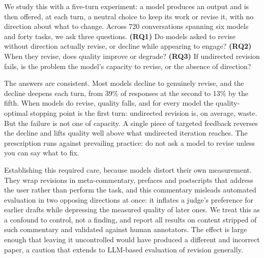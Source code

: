 We study this with a five-turn experiment: a model produces an output and is then offered, at each turn, a neutral choice to keep its work or revise it, with no direction about what to change. Across 720 conversations spanning six models and forty tasks, we ask three questions. \textbf{(RQ1)} Do models asked to revise without direction actually revise, or decline while appearing to engage? \textbf{(RQ2)} When they revise, does quality improve or degrade? \textbf{(RQ3)} If undirected revision fails, is the problem the model's capacity to revise, or the absence of direction?

The answers are consistent. Most models decline to genuinely revise, and the decline deepens each turn, from 39\% of responses at the second to 13\% by the fifth. When models do revise, quality falls, and for every model the quality-optimal stopping point is the first turn: undirected revision is, on average, waste. But the failure is not one of capacity. A single piece of targeted feedback reverses the decline and lifts quality well above what undirected iteration reaches. The prescription runs against prevailing practice: do not ask a model to revise unless you can say what to fix.

Establishing this required care, because models distort their own measurement. They wrap revisions in meta-commentary, prefaces and postscripts that address the user rather than perform the task, and this commentary misleads automated evaluation in two opposing directions at once: it inflates a judge's preference for earlier drafts while depressing the measured quality of later ones. We treat this as a confound to control, not a finding, and report all results on content stripped of such commentary and validated against human annotators. The effect is large enough that leaving it uncontrolled would have produced a different and incorrect paper, a caution that extends to LLM-based evaluation of revision generally.
